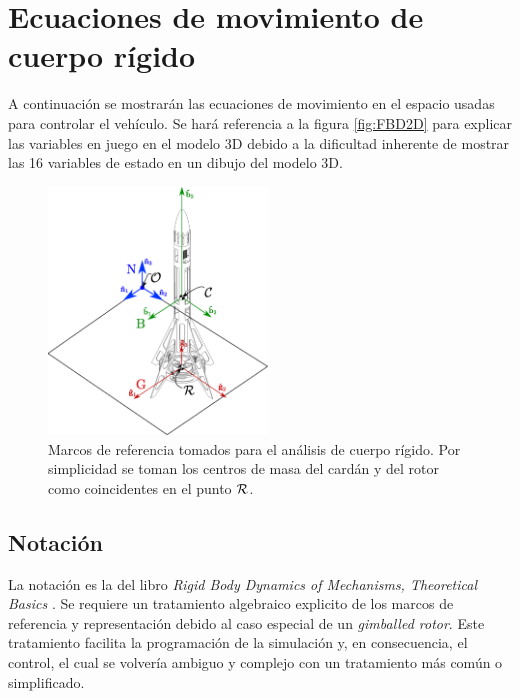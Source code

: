 
\section{Ecuaciones de movimiento de cuerpo rígido} \label{sec:ecuacionesRigid}
A continuación se mostrarán las ecuaciones de movimiento en el espacio usadas para controlar el vehículo.
Se hará referencia a la figura \ref{fig:FBD2D} para explicar las variables en juego en el modelo 3D debido a la dificultad inherente de mostrar las 16 variables de estado en un dibujo del modelo 3D.

\begin{figure}[htb!]
	\centering
	\includegraphics[width=0.52\textwidth]{fig/marcosDiagrama.eps}
	\caption{Marcos de referencia tomados para el análisis de cuerpo rígido. Por simplicidad se toman los centros de masa del cardán y del rotor como coincidentes en el punto $\mathcal{R}$.}
\end{figure}

\subsection{Notación}

La notación es la del libro \textit{Rigid Body Dynamics of Mechanisms, Theoretical Basics} \cite{hahn2013rigid}. Se requiere un tratamiento algebraico explicito de los marcos de referencia y representación debido al caso especial de un \textit{gimballed rotor}. Este tratamiento facilita la programación de la simulación y, en consecuencia, el control, el cual se volvería ambiguo y complejo con un tratamiento más común o simplificado.

